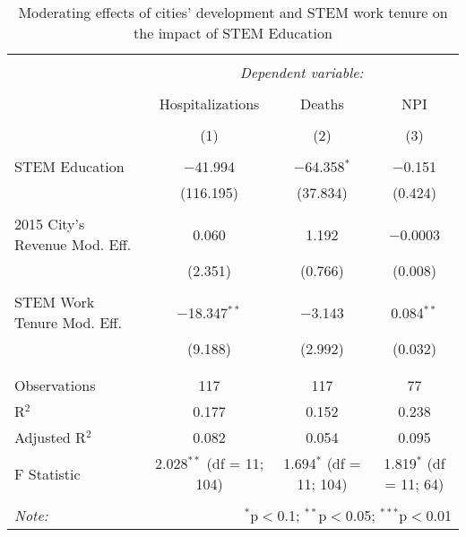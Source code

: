 
\begin{table}[!htbp] \centering 
  \caption{Moderating effects of cities’ development and STEM work tenure on the impact of STEM Education} 
  \label{} 
\begin{tabular}{@{\extracolsep{5pt}}lccc} 
\\[-1.8ex]\hline 
\hline \\[-1.8ex] 
 & \multicolumn{3}{c}{\textit{Dependent variable:}} \\ 
\cline{2-4} 
\\[-1.8ex] & Hospitalizations & Deaths & NPI \\ 
\\[-1.8ex] & (1) & (2) & (3)\\ 
\hline \\[-1.8ex] 
 STEM Education & $-$41.994 & $-$64.358$^{*}$ & $-$0.151 \\ 
  & (116.195) & (37.834) & (0.424) \\ 
  & & & \\ 
 2015 City's Revenue Mod. Eff. & 0.060 & 1.192 & $-$0.0003 \\ 
  & (2.351) & (0.766) & (0.008) \\ 
  & & & \\ 
 STEM Work Tenure Mod. Eff. & $-$18.347$^{**}$ & $-$3.143 & 0.084$^{**}$ \\ 
  & (9.188) & (2.992) & (0.032) \\ 
  & & & \\ 
\hline \\[-1.8ex] 
Observations & 117 & 117 & 77 \\ 
R$^{2}$ & 0.177 & 0.152 & 0.238 \\ 
Adjusted R$^{2}$ & 0.082 & 0.054 & 0.095 \\ 
F Statistic & 2.028$^{**}$ (df = 11; 104) & 1.694$^{*}$ (df = 11; 104) & 1.819$^{*}$ (df = 11; 64) \\ 
\hline 
\hline \\[-1.8ex] 
\textit{Note:}  & \multicolumn{3}{r}{$^{*}$p$<$0.1; $^{**}$p$<$0.05; $^{***}$p$<$0.01} \\ 
\end{tabular} 
\end{table} 
